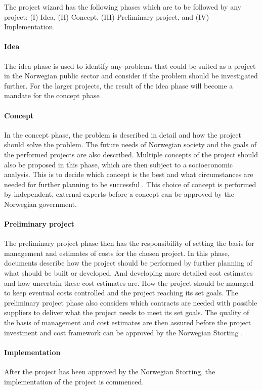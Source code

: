 The project wizard has the following phases which are to be followed by any project: (I) Idea, (II) Concept, (III) Preliminary project, and (IV) Implementation.

\paragraph{Idea}
The idea phase is used to identify any problems that could be suited as a project in the Norwegian public sector and consider if the problem should be investigated further. For the larger projects, the result of the idea phase will become a mandate for the concept phase \cite{project_wizard_r_2019}.

\paragraph{Concept}
In the concept phase, the problem is described in detail and how the project should solve the problem. The future needs of Norwegian society and the goals of the performed projects are also described. Multiple concepts of the project should also be proposed in this phase, which are then subject to a socioeconomic analysis. This is to decide which concept is the best and what circumstances are needed for further planning to be successful \cite{project_wizard_r_2019}. This choice of concept is performed by independent, external experts before a concept can be approved by the Norwegian government.

\paragraph{Preliminary project}
The preliminary project phase then has the responsibility of setting the basis for management and estimates of costs for the chosen project. In this phase, documents describe how the project should be performed by further planning of what should be built or developed. And developing more detailed cost estimates and how uncertain these cost estimates are. How the project should be managed to keep eventual costs controlled and the project reaching its set goals. The preliminary project phase also considers which contracts are needed with possible suppliers to deliver what the project needs to meet its set goals. The quality of the basis of management and cost estimates are then assured before the project investment and cost framework can be approved by the Norwegian Storting \cite{project_wizard_r_2019}. 

\paragraph{Implementation}
After the project has been approved by the Norwegian Storting, the implementation of the project is commenced.

